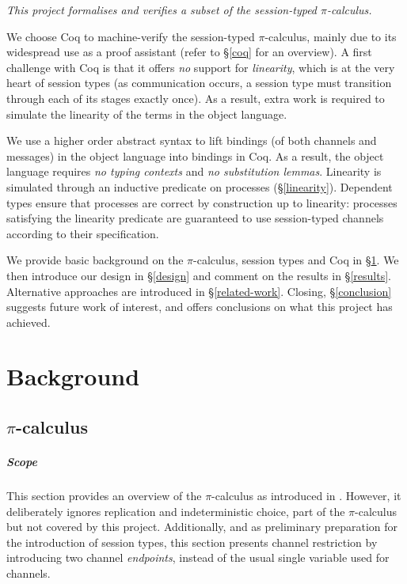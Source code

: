 \documentclass{mproj}
\newcommand{\picalc}{$\pi$-calculus}
\begin{document}
\begin{center}
    \emph{This project formalises and verifies a subset of the session-typed \picalc{}.}
\end{center}

We choose Coq \cite{Coquand1989, CoqDeveloperCommunity} to machine-verify the session-typed \picalc{}, mainly due to its widespread use as a proof assistant (refer to \S \ref{coq} for an overview). A first challenge with Coq is that it offers \emph{no} support for \emph{linearity}, which is at the very heart of session types (as communication occurs, a session type must transition through each of its stages exactly once). As a result, extra work is required to simulate the linearity of the terms in the object language.

We use a higher order abstract syntax \cite{Chlipala2008} to lift bindings (of both channels and messages) in the object language into bindings in Coq. As a result, the object language requires \emph{no typing contexts} and \emph{no substitution lemmas}. Linearity is simulated through an inductive predicate on processes (\S \ref{linearity}). Dependent types ensure that processes are correct by construction up to linearity: processes satisfying the linearity predicate are guaranteed to use session-typed channels according to their specification.

We provide basic background on the \picalc{}, session types and Coq in \S \ref{background}. We then introduce our design in \S \ref{design} and comment on the results in \S \ref{results}. Alternative approaches are introduced in \S \ref{related-work}. Closing, \S \ref{conclusion} suggests future work of interest, and offers conclusions on what this project has achieved.

\chapter{Background}\label{background}

\section{\picalc}\label{pi-calculus}

\paragraph{Scope} This section provides an overview of the \picalc{} as introduced in \cite{Sangiorgi2001}. However, it deliberately ignores replication and indeterministic choice, part of the \picalc{} but not covered by this project. Additionally, and as preliminary preparation for the introduction of session types, this section presents channel restriction by introducing two channel \emph{endpoints}, instead of the usual single variable used for channels.
\end{document}
